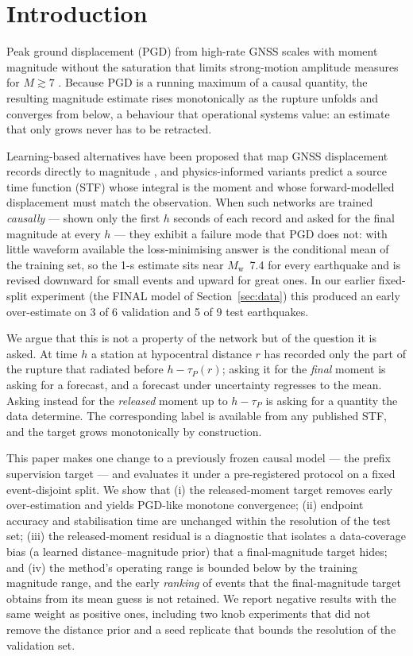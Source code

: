 \documentclass[12pt,letterpaper]{article}
\newcommand{\Mw}{M_{\mathrm{w}}}
\newcommand{\verify}[1]{\textcolor{orange!80!black}{[verify: #1]}}
\begin{document}
\section{Introduction}

Peak ground displacement (PGD) from high-rate GNSS scales with moment magnitude without the saturation that limits strong-motion amplitude measures for $M\gtrsim7$ \citep{Crowell2013,Melgar2015,Ruhl2019}. Because PGD is a running maximum of a causal quantity, the resulting magnitude estimate rises monotonically as the rupture unfolds and converges from below, a behaviour that operational systems value: an estimate that only grows never has to be retracted.

Learning-based alternatives have been proposed that map GNSS displacement records directly to magnitude \citep[e.g.][\verify{}]{Lin2021}, and physics-informed variants predict a source time function (STF) whose integral is the moment and whose forward-modelled displacement must match the observation. When such networks are trained \emph{causally} --- shown only the first $h$ seconds of each record and asked for the final magnitude at every $h$ --- they exhibit a failure mode that PGD does not: with little waveform available the loss-minimising answer is the conditional mean of the training set, so the 1-s estimate sits near $\Mw$~7.4 for every earthquake and is revised downward for small events and upward for great ones. In our earlier fixed-split experiment (the FINAL model of Section~\ref{sec:data}) this produced an early over-estimate on 3 of 6 validation and 5 of 9 test earthquakes.

We argue that this is not a property of the network but of the question it is asked. At time $h$ a station at hypocentral distance $r$ has recorded only the part of the rupture that radiated before $h-\tau_P(r)$; asking it for the \emph{final} moment is asking for a forecast, and a forecast under uncertainty regresses to the mean. Asking instead for the \emph{released} moment up to $h-\tau_P$ is asking for a quantity the data determine. The corresponding label is available from any published STF, and the target grows monotonically by construction.

This paper makes one change to a previously frozen causal model --- the prefix supervision target --- and evaluates it under a pre-registered protocol on a fixed event-disjoint split. We show that (i) the released-moment target removes early over-estimation and yields PGD-like monotone convergence; (ii) endpoint accuracy and stabilisation time are unchanged within the resolution of the test set; (iii) the released-moment residual is a diagnostic that isolates a data-coverage bias (a learned distance--magnitude prior) that a final-magnitude target hides; and (iv) the method's operating range is bounded below by the training magnitude range, and the early \emph{ranking} of events that the final-magnitude target obtains from its mean guess is not retained. We report negative results with the same weight as positive ones, including two knob experiments that did not remove the distance prior and a seed replicate that bounds the resolution of the validation set.
\end{document}
